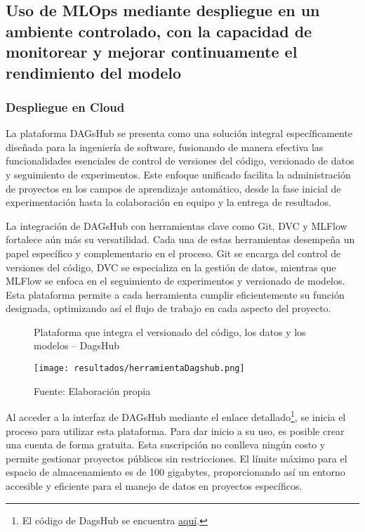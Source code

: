 \subsection{Uso de MLOps mediante despliegue en un ambiente controlado, con la capacidad de monitorear y mejorar continuamente el rendimiento del modelo}

\subsubsection{Despliegue en Cloud}

La plataforma DAGsHub se presenta como una solución integral específicamente diseñada para la ingeniería de software, fusionando de manera efectiva las funcionalidades esenciales de control de versiones del código, versionado de datos y seguimiento de experimentos. Este enfoque unificado facilita la administración de proyectos en los campos de aprendizaje automático, desde la fase inicial de experimentación hasta la colaboración en equipo y la entrega de resultados. \newline

La integración de DAGsHub con herramientas clave como Git, DVC y MLFlow fortalece aún más su versatilidad. Cada una de estas herramientas desempeña un papel específico y complementario en el proceso. Git se encarga del control de versiones del código, DVC se especializa en la gestión de datos, mientras que MLFlow se enfoca en el seguimiento de experimentos y versionado de modelos. Esta plataforma permite a cada herramienta cumplir eficientemente su función designada, optimizando así el flujo de trabajo en cada aspecto del proyecto.

\newpage

\begin{figure}[h]
\centering
\caption{Plataforma que integra el versionado del código, los datos y los modelos – DagsHub}
\texttt{[image: resultados/herramientaDagshub.png]}
\caption*{\footnotesize Fuente: Elaboración propia}
\label{fig:figuraHerramientaDagshub}
\end{figure}

Al acceder a la interfaz de DAGsHub mediante el enlace detallado\footnote{El código de DagsHub se encuentra \href{https://dagshub.com/juferoto/mlops_project}{aquí}.}, se inicia el proceso para utilizar esta plataforma. Para dar inicio a su uso, es posible crear una cuenta de forma gratuita. Esta suscripción no conlleva ningún costo y permite gestionar proyectos públicos sin restricciones. El límite máximo para el espacio de almacenamiento es de 100 gigabytes, proporcionando así un entorno accesible y eficiente para el manejo de datos en proyectos específicos. \newline

